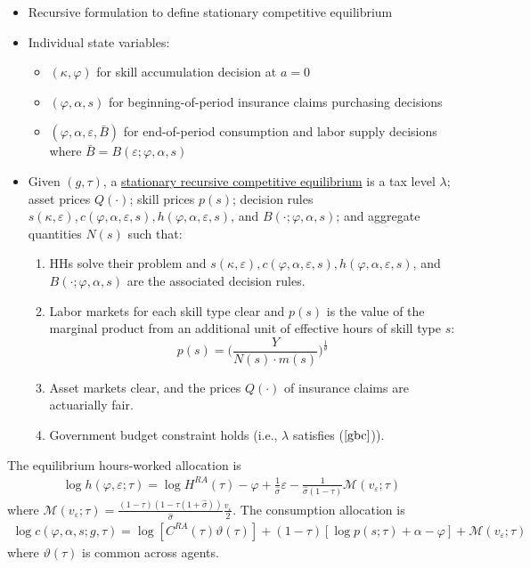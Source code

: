 \documentclass{article}
\newcommand{\M}{\mathcal{M}}
\begin{document}
\begin{itemize}
\item Recursive formulation to define stationary competitive equilibrium
\item Individual state variables:
\begin{itemize}
\item $(\kappa, \varphi)$ for skill accumulation decision at $a = 0$
\item $(\varphi, \alpha, s)$ for beginning-of-period insurance claims purchasing decisions
\item $(\varphi, \alpha, \varepsilon, \bar B)$ for end-of-period consumption and labor supply decisions where $\bar B = B(\varepsilon; \varphi, \alpha, s)$
\end{itemize}
\item Given $(g, \tau)$, a \underline{stationary recursive competitive equilibrium} is a tax level $\lambda$; asset prices $Q(\cdot)$; skill prices $p(s)$; decision rules $s(\kappa, \varepsilon), c(\varphi, \alpha, \varepsilon, s), h(\varphi, \alpha, \varepsilon, s)$, and $B(\cdot; \varphi, \alpha, s)$; and aggregate quantities $N(s)$ such that:
\begin{enumerate}
\item HHs solve their problem and $s(\kappa, \varepsilon), c(\varphi, \alpha, \varepsilon, s), h(\varphi, \alpha, \varepsilon, s)$, and $B(\cdot; \varphi, \alpha, s)$ are the associated decision rules.
\item Labor markets for each skill type clear and $p(s)$ is the value of the marginal product from an additional unit of effective hours of skill type $s$:
$$
p(s) = \Bigg( \frac{Y}{N(s)\cdot m(s)} \Bigg)^{\frac{1}{\theta}}
$$
\item Asset markets clear, and the prices $Q(\cdot)$ of insurance claims are actuarially fair.
\item Government budget constraint holds (i.e., $\lambda$ satisfies ($\ref{gbc}$)).
\end{enumerate}
\end{itemize}



{
\proposition The equilibrium hours-worked allocation is
\begin{align}
\log h(\varphi, \varepsilon; \tau) = \log H^{RA}(\tau) - \varphi + \frac{1}{\hat{\sigma}} \varepsilon - \frac{1}{\hat \sigma (1- \tau)} \M (v_\varepsilon; \tau) \label{prop1_h}
\end{align}
where $\M ( v_\varepsilon; \tau) = \frac{(1-\tau)(1 - \tau(1+\hat \sigma))}{\hat \sigma} \frac{v_\varepsilon}{2}$. The consumption allocation is 
\begin{align}
\log c(\varphi, \alpha, s; g, \tau) = \log [C^{RA}(\tau)\vartheta(\tau)] + (1 - \tau) [\log p(s; \tau) + \alpha - \varphi] + \M (v_\varepsilon; \tau) \label{prop1_c}
\end{align}
where $\vartheta(\tau)$ is common across agents.
}
\end{document}
